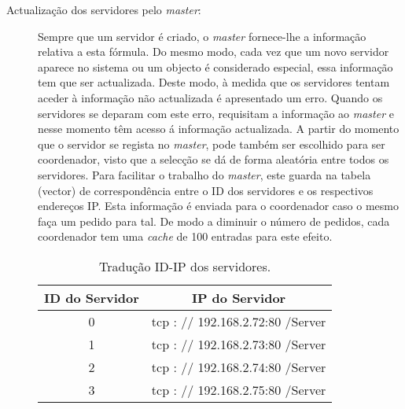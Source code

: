 \begin{description}
\item[Actualização dos servidores pelo \textit{master}:]
Sempre que um servidor é criado, o \textit{master} fornece-lhe a informação relativa a esta fórmula. Do mesmo modo, cada vez que um novo servidor aparece no sistema ou um objecto é considerado especial, essa informação tem que ser actualizada. Deste modo, à medida que os servidores tentam aceder à informação não actualizada é apresentado um erro. Quando os servidores se deparam com este erro, requisitam a informação ao \textit{master} e nesse momento têm acesso á informação actualizada.  A partir do momento que o servidor se regista no \textit{master},  pode também ser escolhido para ser coordenador, visto que a selecção se dá de forma aleatória entre todos os servidores.
Para facilitar o trabalho do \textit{master}, este guarda na tabela (vector) de correspondência entre o ID dos servidores e os respectivos endereços IP. Esta informação é enviada para o coordenador caso o mesmo faça um pedido para tal. De modo a diminuir o número de pedidos, cada coordenador tem uma \textit{cache} de 100 entradas para este efeito.

\begin{table}
\centering
\begin{tabular}{c|c}
ID do Servidor & IP do Servidor \\\hline
0 & tcp : // 192.168.2.72:80 /Server \\
1 & tcp : // 192.168.2.73:80 /Server \\
2 & tcp : // 192.168.2.74:80 /Server \\
3 & tcp : // 192.168.2.75:80 /Server \\
\end{tabular}
\caption{\label{tab:idip}Tradução ID-IP dos servidores.}
\end{table}
\end{description}